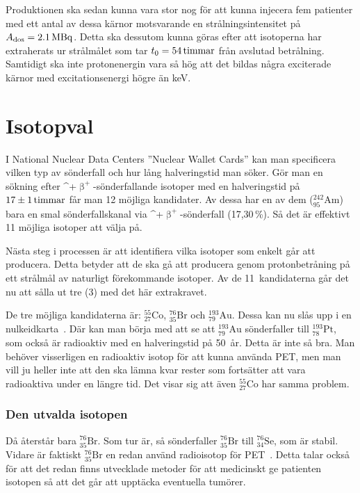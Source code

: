 \documentclass[11pt,a4paper, german, english, swedish
]{article}
\newcommand{\BP}{\ifmmode\upbeta^{+}\else$\upbeta^{\!+}$\fi}
\begin{document}
Produktionen ska sedan kunna vara stor nog för att kunna injecera fem patienter med ett antal av dessa kärnor motsvarande en strålningsintensitet på $A_\text{dos}=\unit[2.1]{MBq}$. Detta ska dessutom kunna göras efter att isotoperna har extraherats ur strålmålet som tar $t_0=\unit[54]{timmar}$ från avslutad betrålning. Samtidigt ska inte protonenergin vara så hög att det bildas några exciterade kärnor med excitationsenergi högre än \unit[200]{keV}. 



\section{Isotopval}
I National Nuclear Data Centers ''Nuclear Wallet Cards''\cite{NNDC_wallet} kan man specificera vilken typ av sönderfall och hur lång halveringstid man söker. Gör man en sökning efter \BP-sönderfallande isotoper med en halveringstid på $\unit[17\pm 1]{timmar}$ får man 12 möjliga kandidater. Av dessa har en av dem ($^{242}_{95}\!\mathrm{Am}$) bara en smal sönderfallskanal via \BP-sönderfall (17,30\,\%). Så det är effektivt 11 möjliga isotoper att välja på.

Nästa steg i processen är att identifiera vilka isotoper som enkelt går att producera. Detta betyder att de ska gå att producera genom protonbetråning på ett strålmål av naturligt förekommande isotoper\footnotemark{}. Av de 11~kandidaterna går det nu att sålla ut tre (3) med det här extrakravet. 

De tre möjliga kandidaterna är: $^{55}_{27}\mathrm{Co}$, $^{76}_{35}\mathrm{Br}$ och $^{193}_{79}\!\mathrm{Au}$. Dessa kan nu slås upp i en nulkeidkarta~\cite{NNDC_chart}. Där kan man börja med att se att $^{193}_{79}\!\mathrm{Au}$ sönderfaller till $^{193}_{78}\mathrm{Pt}$, som också är radioaktiv med en halveringstid på 50~år. Detta är inte så bra. Man behöver visserligen en radioaktiv isotop för att kunna använda PET, men man vill ju heller inte att den ska lämna kvar rester som fortsätter att vara radioaktiva under en längre tid. Det visar sig att även $^{55}_{27}\mathrm{Co}$ har samma problem.

\subsubsection*{Den utvalda isotopen}
Då återstår bara $^{76}_{35}\mathrm{Br}$. Som tur är, så sönderfaller $^{76}_{35}\mathrm{Br}$ till $^{76}_{34}\mathrm{Se}$, som är stabil. Vidare är faktiskt $^{76}_{35}\mathrm{Br}$ en redan använd radioisotop för PET~\cite{Lapi_PET,Valette_etal1993,Lovqvist_etal1997,Ribeiro_etal1999}. Detta talar också för att det redan finns utvecklade metoder för att medicinskt ge patienten isotopen så att det går att upptäcka eventuella tumörer. 
\end{document}
